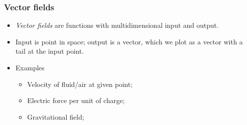 \begin{frame}
\frametitle{Vector fields}
\begin{itemize}
\item \emph{Vector fields} are functions with multidimensional input and output.
\item Input is point in space; output is a vector, which we plot as a vector with a tail at the input point.
\item Examples
\begin{itemize}
  \item Velocity of fluid/air at given point;
  \item Electric force per unit of charge;
  \item Gravitational field;
\end{itemize}
\end{itemize}
\end{frame}

